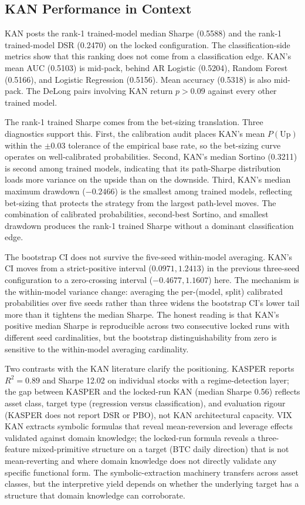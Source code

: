 \documentclass[12pt,a4paper,oneside]{article}
\begin{document}
\subsection{KAN Performance in Context}\label{subsec:disc_kan}

KAN posts the rank-1 trained-model median Sharpe (0.5588) and the rank-1 trained-model DSR (0.2470) on the locked configuration. The classification-side metrics show that this ranking does not come from a classification edge. KAN's mean AUC (0.5103) is mid-pack, behind AR Logistic (0.5204), Random Forest (0.5166), and Logistic Regression (0.5156). Mean accuracy (0.5318) is also mid-pack. The DeLong pairs involving KAN return $p > 0.09$ against every other trained model.

The rank-1 trained Sharpe comes from the bet-sizing translation. Three diagnostics support this. First, the calibration audit places KAN's mean $P(\text{Up})$ within the $\pm 0.03$ tolerance of the empirical base rate, so the bet-sizing curve operates on well-calibrated probabilities. Second, KAN's median Sortino (0.3211) is second among trained models, indicating that its path-Sharpe distribution loads more variance on the upside than on the downside. Third, KAN's median maximum drawdown ($-0.2466$) is the smallest among trained models, reflecting bet-sizing that protects the strategy from the largest path-level moves. The combination of calibrated probabilities, second-best Sortino, and smallest drawdown produces the rank-1 trained Sharpe without a dominant classification edge.

The bootstrap CI does not survive the five-seed within-model averaging. KAN's CI moves from a strict-positive interval ($0.0971, 1.2413$) in the previous three-seed configuration to a zero-crossing interval ($-0.4677, 1.1607$) here. The mechanism is the within-model variance change: averaging the per-(model, split) calibrated probabilities over five seeds rather than three widens the bootstrap CI's lower tail more than it tightens the median Sharpe. The honest reading is that KAN's positive median Sharpe is reproducible across two consecutive locked runs with different seed cardinalities, but the bootstrap distinguishability from zero is sensitive to the within-model averaging cardinality.

Two contrasts with the KAN literature clarify the positioning. KASPER \citep{kasper_2025} reports $R^2 = 0.89$ and Sharpe 12.02 on individual stocks with a regime-detection layer; the gap between KASPER and the locked-run KAN (median Sharpe 0.56) reflects asset class, target type (regression versus classification), and evaluation rigour (KASPER does not report DSR or PBO), not KAN architectural capacity. VIX KAN \citep{cho_vix_2025} extracts symbolic formulas that reveal mean-reversion and leverage effects validated against domain knowledge; the locked-run formula reveals a three-feature mixed-primitive structure on a target (BTC daily direction) that is not mean-reverting and where domain knowledge does not directly validate any specific functional form. The symbolic-extraction machinery transfers across asset classes, but the interpretive yield depends on whether the underlying target has a structure that domain knowledge can corroborate.
\end{document}
